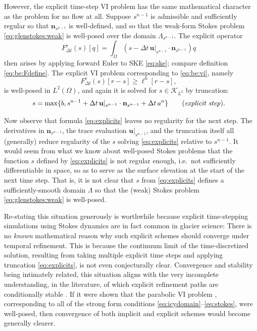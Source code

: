 \documentclass[hidelinks,onefignum,onetabnum,final]{siamart220329}  %
\newcommand{\bn}{\mathbf{n}}
\newcommand{\bu}{\mathbf{u}}
\newcommand{\cK}{\mathcal{K}}
\begin{document}
However, the explicit time-step VI problem has the same mathematical character as the problem for no flow at all.  Suppose $s^{n-1}$ is admissible and sufficiently regular so that $\bn_{s^{n-1}}$ is well-defined, and so that the weak-form Stokes problem \eqref{eq:glenstokes:weak} is well-posed over the domain $\Lambda_{s^{n-1}}$.  The explicit operator
\begin{equation}
F^{\text{e}}_{\Delta t}(s)[q] = \int_\Omega \left(s - \Delta t\, \bu|_{s^{n-1}} \cdot \bn_{s^{n-1}}\right) q  \label{eq:explicitFdefine}
\end{equation}
then arises by applying forward Euler to SKE \eqref{eq:ske}; compare definition \eqref{eq:be:Fdefine}.  The explicit VI problem corresponding to \eqref{eq:be:vi}, namely
\begin{equation}
F^{\text{e}}_{\Delta t}(s)[r-s] \ge \ell^n[r-s],
\end{equation}
is well-posed in $L^2(\Omega)$, and again it is solved for $s \in \cK_{L^2}$ by truncation:
\begin{equation}
s = \max\{b, s^{n-1} + \Delta t\, \bu|_{s^{n-1}} \cdot \bn_{s^{n-1}} + \Delta t\,a^n\} \qquad (\text{\emph{explicit step}}). \label{eq:explicits}
\end{equation}

Now observe that formula \eqref{eq:explicits} leaves no regularity for the next step.  The derivatives in $\bn_{s^{n-1}}$, the trace evaluation $\bu|_{s^{n-1}}$, and the truncation itself all (generally) reduce regularity of the $s$ solving \eqref{eq:explicits} relative to $s^{n-1}$.  It would seem from what we know about well-posed Stokes problems that the function $s$ defined by \eqref{eq:explicits} is not regular enough, i.e.~not sufficiently differentiable in space, so as to serve as the surface elevation at the start of the next time step.  That is, it is not clear that $s$ from \eqref{eq:explicits} defines a sufficiently-smooth domain $\Lambda$ so that the (weak) Stokes problem \eqref{eq:glenstokes:weak} is well-posed.

Re-stating this situation generously is worthwhile because explicit time-stepping simulations using Stokes dynamics are in fact common in glacier science:  There is no \emph{known} mathematical reason why such explicit schemes should converge under temporal refinement.  This is because the continuum limit of the time-discretized solution, resulting from taking multiple explicit time steps and applying truncation \eqref{eq:explicits}, is not even conjecturally clear.  Convergence and stability being intimately related, this situation aligns with the very incomplete understanding, in the literature, of which explicit refinement paths are conditionally stable \cite[and references therein]{Bueler2023,Chengetal2017,LofgrenAhlkronaHelanow2022}.  If it were shown that the parabolic  VI problem \cite{Glowinski1984}, corresponding to all of the strong form conditions \eqref{eq:icydomain}--\eqref{eq:stokes}, were well-posed, then convergence of both implicit and explicit schemes would become generally clearer.
\end{document}

